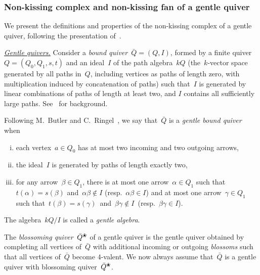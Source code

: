 \documentclass{amsart}
\theoremstyle{definition}
\newcommand{\ssm}{\smallsetminus} %
\newcommand{\darkblue}{\color{darkblue}} %
\newcommand{\defn}[1]{\textsl{\darkblue #1}} %
\newcommand{\para}[1]{\medskip\noindent\uline{\textit{#1.}}} %
\newcommand{\quiver}{\bar Q} %
\newcommand{\blossom}{^\text{\ding{96}}} %
\begin{document}
\subsubsection{Non-kissing complex and non-kissing fan of a gentle quiver}
\label{subsubsec:nonkissingComplex}

We present the definitions and properties of the non-kissing complex of a gentle quiver, following the presentation of~\cite{PaluPilaudPlamondon-nonkissing}.

\para{Gentle quivers}
%
Consider a \defn{bound quiver}~${\quiver = (Q,I)}$, formed by a finite quiver~$Q = (Q_0, Q_1, s, t)$ and an ideal~$I$ of the path algebra~$kQ$ (the~$k$-vector space generated by all paths in~$Q$, including vertices as paths of length zero, with multiplication induced by concatenation of paths) such that~$I$ is generated by linear combinations of paths of length at least two, and $I$ contains all sufficiently large paths. See~\cite{AssemSimsonSkowronski} for background.

Following M.~Butler and C.~Ringel~\cite{ButlerRingel}, we say that~$\quiver$ is a \defn{gentle bound quiver} when
\begin{enumerate}[(i)]
\item each vertex~$a \in Q_0$ has at most two incoming and two outgoing arrows,
\item the ideal~$I$ is generated by paths of length exactly two,
\item for any arrow~$\beta \in Q_1$, there is at most one arrow~$\alpha \in Q_1$ such that~$t(\alpha) = s(\beta)$ and~${\alpha\beta\notin I}$ (resp.~$\alpha\beta \in I$) and at most one arrow~$\gamma \in Q_1$ such that~$t(\beta) = s(\gamma)$~and~${\beta\gamma\notin I}$~(resp.~${\beta\gamma \in I}$).
\end{enumerate}
The algebra~$kQ/I$ is called a \defn{gentle algebra}.

The \defn{blossoming quiver}~$\quiver\blossom$ of a gentle quiver is the gentle quiver obtained by completing all vertices of~$\quiver$ with additional incoming or outgoing \defn{blossoms} such that all vertices of~$\quiver$ become $4$-valent.
%
%
We now always assume that~$\quiver$ is a gentle quiver with blossoming quiver~$\quiver\blossom$.
\end{document}
